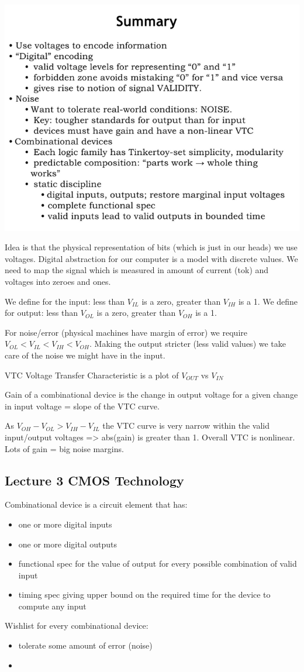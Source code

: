 \documentclass[a4paper,twoside]{article}
\numberwithin{equation}{section}
\begin{document}
\begin{center}
    \includegraphics[scale = 0.3]{assets/summary_digital_abstraction.png}
\end{center}

Idea is that the physical representation of bits (which is just in our heads) we use voltages.
Digital abstraction for our computer is a model with discrete values.
We need to map the signal which is measured in amount of current (tok) and voltages into zeroes and ones.

We define for the input: less than  $V_{IL}$ is a zero, greater than $V_{IH}$ is a 1.
We define for output: less than $V_{OL}$ is a zero, greater than $V_{OH}$ is a 1.

For noise/error (physical machines have margin of error) we require $V_{OL} < V_{IL} < V_{IH} < V_{OH}$.
Making the output stricter (less valid values) we take care of the noise we might have in the input.

VTC Voltage Transfer Characteristic is a plot of $V_{OUT}$ vs $V_{IN}$

Gain of a combinational device is the change in output voltage for a given change in input voltage =
slope of the VTC curve.

As $V_{OH} - V_{OL} > V_{IH} - V_{IL}$ the VTC curve is very narrow within the valid input/output voltages =>
abs(gain) is greater than 1.
Overall VTC is nonlinear.
Lots of gain = big noise margins.


\subsection{Lecture 3 CMOS Technology}
Combinational device is a circuit element that has:
\begin{itemize}
    \item one or more digital inputs
    \item one or more digital outputs
    \item functional spec for the value of output for every possible combination of valid input
    \item timing spec giving upper bound on the required time for the device to compute any input
\end{itemize}

Wishlist for every combinational device:
\begin{itemize}
    \item tolerate some amount of error (noise)
    \item
\end{itemize}
\end{document}
